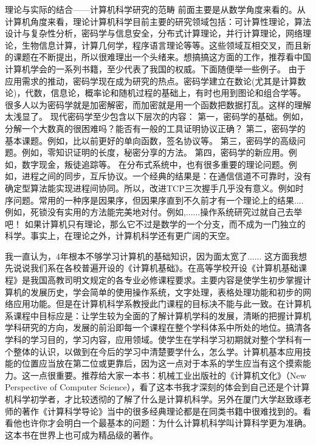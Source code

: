 理论与实际的结合——计算机科学研究的范畴
前面主要是从数学角度来看的。从计算机角度来看，理论计算机科学目前主要的研究领域包括：可计算性理论，算法设计与复杂性分析，密码学与信息安全，分布式计算理论，并行计算理论，网络理论，生物信息计算，计算几何学，程序语言理论等等。这些领域互相交叉，而且新的课题在不断提出，所以很难理出一个头绪来。想搞搞这方面的工作，推荐看中国计算机学会的一系列书籍，至少代表了我国的权威。下面随便举一些例子。
由于应用需求的推动，密码学现在成为研究的热点。密码学建立在数论(尤其是计算数论)，代数，信息论，概率论和随机过程的基础上，有时也用到图论和组合学等。很多人以为密码学就是加密解密，而加密就是用一个函数把数据打乱。这样的理解太浅显了。
现代密码学至少包含以下层次的内容：
第一，密码学的基础。例如，分解一个大数真的很困难吗？能否有一般的工具证明协议正确？
第二，密码学的基本课题。例如，比以前更好的单向函数，签名协议等。
第三，密码学的高级问题。例如，零知识证明的长度，秘密分享的方法。
第四，密码学的新应用。例如，数字现金，叛徒追踪等。
在分布式系统中，也有很多重要的理论问题。例如，进程之间的同步，互斥协议。一个经典的结果是：在通信信道不可靠时，没有确定型算法能实现进程间协同。所以，改进TCP三次握手几乎没有意义。例如时序问题。常用的一种序是因果序，但因果序直到不久前才有一个理论上的结果....例如，死锁没有实用的方法能完美地对付。例如,......操作系统研究过就自己去举吧！
如果计算机只有理论，那么它不过是数学的一个分支，而不成为一门独立的科学。事实上，在理论之外，计算机科学还有更广阔的天空。

我一直认为，4年根本不够学习计算机的基础知识，因为面太宽了......
这方面我想先说说我们系在各校普遍开设的《计算机基础》。在高等学校开设《计算机基础课程》是我国高教司明文规定的各专业必修课程要求。主要内容是使学生初步掌握计算机的发展历史，学会简单的使用操作系统，文字处理，表格处理功能和初步的网络应用功能。但是在计算机科学系教授此门课程的目标决不能与此一致。在计算机系课程中目标应是：让学生较为全面的了解计算机学科的发展，清晰的把握计算机学科研究的方向，发展的前沿即每一个课程在整个学科体系中所处的地位。搞清各学科的学习目的，学习内容，应用领域。使学生在学科学习初期就对整个学科有一个整体的认识，以做到在今后的学习中清楚要学什么，怎么学。计算机基本应用技能的位置应当放在第二位或更靠后，因为这一点对于本系的学生应当有这个摸索能力。这一点很重要。推荐给大家一本书：机械工业出版社的《计算机文化》（New Perspective of Computer Science），看了这本书我才深刻的体会到自己还是个计算机科学初学者，才比较透彻的了解了什么是计算机科学。另外在厦门大学赵致琢老师的著作《计算科学导论》当中的很多经典理论都是在同类书籍中很难找到的。看看他也许你才会明白一个最基本的问题：为什么计算机科学叫计算科学更为准确。这本书在世界上也可成为精品级的著作。

